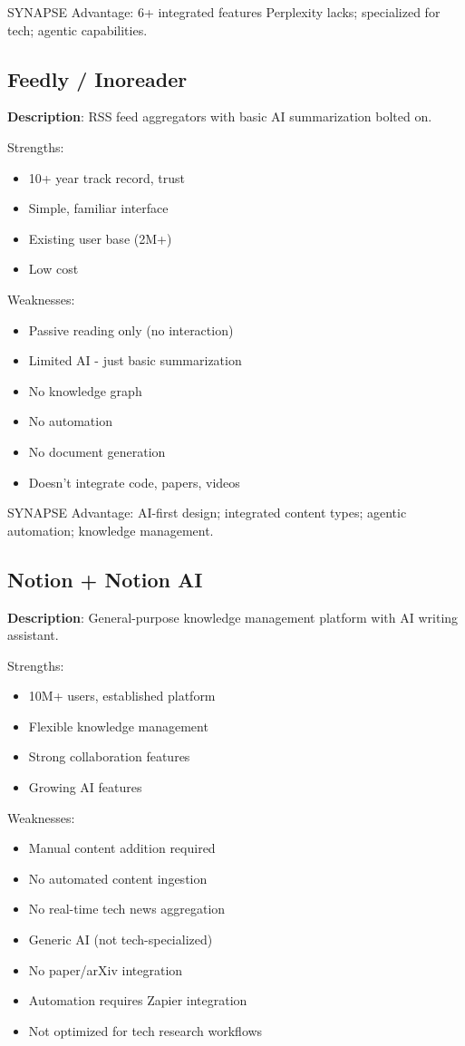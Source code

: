 \documentclass{report}
\begin{document}
SYNAPSE Advantage: 6+ integrated features Perplexity lacks; specialized for tech; agentic capabilities.

\subsection{Feedly / Inoreader}

\textbf{Description}: RSS feed aggregators with basic AI summarization bolted on.

Strengths:
\begin{itemize}
    \item 10+ year track record, trust
    \item Simple, familiar interface
    \item Existing user base (2M+)
    \item Low cost
\end{itemize}

Weaknesses:
\begin{itemize}
    \item Passive reading only (no interaction)
    \item Limited AI - just basic summarization
    \item No knowledge graph
    \item No automation
    \item No document generation
    \item Doesn't integrate code, papers, videos
\end{itemize}

SYNAPSE Advantage: AI-first design; integrated content types; agentic automation; knowledge management.

\subsection{Notion + Notion AI}

\textbf{Description}: General-purpose knowledge management platform with AI writing assistant.

Strengths:
\begin{itemize}
    \item 10M+ users, established platform
    \item Flexible knowledge management
    \item Strong collaboration features
    \item Growing AI features
\end{itemize}

Weaknesses:
\begin{itemize}
    \item Manual content addition required
    \item No automated content ingestion
    \item No real-time tech news aggregation
    \item Generic AI (not tech-specialized)
    \item No paper/arXiv integration
    \item Automation requires Zapier integration
    \item Not optimized for tech research workflows
\end{itemize}
\end{document}
